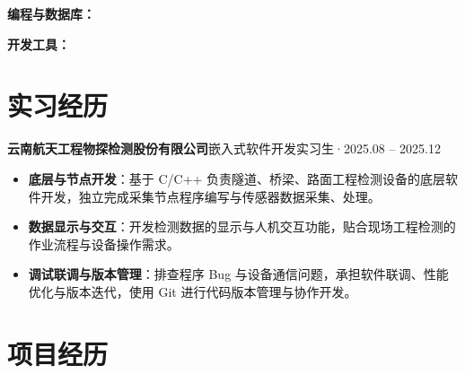 \documentclass[10pt,a4paper]{article}
\begin{document}
\vspace{2pt}

{\bfseries\color{primary}编程与数据库：}

\vspace{2pt}

{\bfseries\color{primary}开发工具：}

\section{\faBriefcase\hspace{0.4em}实习经历}

{\bfseries 云南航天工程物探检测股份有限公司}\hfill{\color{graytext}嵌入式软件开发实习生\hspace{0.3em}·\hspace{0.3em}2025.08 -- 2025.12}

\vspace{2pt}

\begin{itemize}[leftmargin=1.5em, itemsep=2pt, parsep=0pt, topsep=2pt]
    \item \textbf{底层与节点开发}：基于 C/C++ 负责隧道、桥梁、路面工程检测设备的底层软件开发，独立完成采集节点程序编写与传感器数据采集、处理。
    \item \textbf{数据显示与交互}：开发检测数据的显示与人机交互功能，贴合现场工程检测的作业流程与设备操作需求。
    \item \textbf{调试联调与版本管理}：排查程序 Bug 与设备通信问题，承担软件联调、性能优化与版本迭代，使用 Git 进行代码版本管理与协作开发。
\end{itemize}

\vspace{0.12em}

\section{\faProjectDiagram\hspace{0.4em}项目经历}
\end{document}
